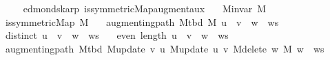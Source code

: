 \begin{isabellebody}
\ \ \ \ \isacommand{{\isachardot}{\kern0pt}}\isamarkupfalse%
\isanewline
{}\isamarkupfalse%
%
\endisatagproof
{\isafoldproof}%
%
\isadelimproof
\isanewline
%
\endisadelimproof
%
\isadeliminvisible
\isanewline
%
\endisadeliminvisible
%
\isataginvisible
{}\isamarkupfalse%
\ {\isacharparenleft}{\kern0pt}\ edmonds{\isacharunderscore}{\kern0pt}karp{\isacharparenright}{\kern0pt}\ is{\isacharunderscore}{\kern0pt}symmetric{\isacharunderscore}{\kern0pt}Map{\isacharunderscore}{\kern0pt}augment{\isacharunderscore}{\kern0pt}aux{\isacharcolon}{\kern0pt}\isanewline
\ \ \ {\isachardoublequoteopen}M{\isachardot}{\kern0pt}invar\ M{\isachardoublequoteclose}\isanewline
\ \ \ {\isachardoublequoteopen}is{\isacharunderscore}{\kern0pt}symmetric{\isacharunderscore}{\kern0pt}Map\ M{\isachardoublequoteclose}\isanewline
\ \ \ {\isachardoublequoteopen}augmenting{\isacharunderscore}{\kern0pt}path\ {\isacharparenleft}{\kern0pt}M{\isacharunderscore}{\kern0pt}tbd\ M{\isacharparenright}{\kern0pt}\ {\isacharparenleft}{\kern0pt}u\ {\isacharhash}{\kern0pt}\ v\ {\isacharhash}{\kern0pt}\ w\ {\isacharhash}{\kern0pt}\ ws{\isacharparenright}{\kern0pt}{\isachardoublequoteclose}\isanewline
\ \ \ {\isachardoublequoteopen}distinct\ {\isacharparenleft}{\kern0pt}u\ {\isacharhash}{\kern0pt}\ v\ {\isacharhash}{\kern0pt}\ w\ {\isacharhash}{\kern0pt}\ ws{\isacharparenright}{\kern0pt}{\isachardoublequoteclose}\isanewline
\ \ \ {\isachardoublequoteopen}even\ {\isacharparenleft}{\kern0pt}length\ {\isacharparenleft}{\kern0pt}u\ {\isacharhash}{\kern0pt}\ v\ {\isacharhash}{\kern0pt}\ w\ {\isacharhash}{\kern0pt}\ ws{\isacharparenright}{\kern0pt}{\isacharparenright}{\kern0pt}{\isachardoublequoteclose}\isanewline
\ \ \ {\isachardoublequoteopen}augmenting{\isacharunderscore}{\kern0pt}path\ {\isacharparenleft}{\kern0pt}M{\isacharunderscore}{\kern0pt}tbd\ {\isacharparenleft}{\kern0pt}M{\isacharunderscore}{\kern0pt}update\ v\ u\ {\isacharparenleft}{\kern0pt}M{\isacharunderscore}{\kern0pt}update\ u\ v\ {\isacharparenleft}{\kern0pt}M{\isacharunderscore}{\kern0pt}delete\ w\ M{\isacharparenright}{\kern0pt}{\isacharparenright}{\kern0pt}{\isacharparenright}{\kern0pt}{\isacharparenright}{\kern0pt}\ {\isacharparenleft}{\kern0pt}w\ {\isacharhash}{\kern0pt}\ ws{\isacharparenright}{\kern0pt}{\isachardoublequoteclose}%
\endisataginvisible
{\isafoldinvisible}%
%
\isadeliminvisible
\isanewline
%
\endisadeliminvisible
%
\isadelimproof
%
\endisadelimproof
%
\isatagproof
{}\isamarkupfalse%

\end{isabellebody}
